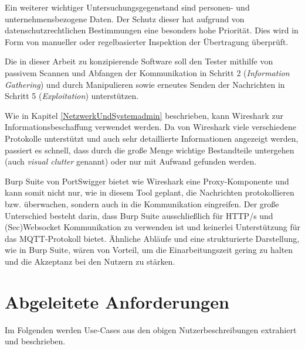     Ein weiterer wichtiger Untersuchungsgegenstand sind personen- und unternehmensbezogene Daten. Der Schutz dieser hat aufgrund von datenschutzrechtlichen Bestimmungen eine besonders hohe Priorität. Dies wird in Form von manueller oder regelbasierter Inspektion der Übertragung überprüft.
    
    
    Die in dieser Arbeit zu konzipierende Software soll den Tester mithilfe von passivem Scannen und Abfangen der Kommunikation in Schritt 2 (\emph{Information Gathering}) und durch Manipulieren sowie erneutes Senden der Nachrichten in Schritt 5 (\emph{Exploitation}) unterstützen.
    
    Wie in Kapitel \ref{NetzwerkUndSystemadmin} beschrieben, kann Wireshark zur Informationsbeschaffung verwendet werden.
    Da von Wireshark viele verschiedene Protokolle unterstützt und auch sehr detaillierte Informationen angezeigt werden, passiert es schnell, dass durch die große Menge wichtige Bestandteile untergehen (auch \emph{visual clutter} genannt) oder nur mit Aufwand gefunden werden.
    
    Burp Suite von PortSwigger bietet wie Wireshark eine Proxy-Komponente und kann somit nicht nur, wie in diesem Tool geplant, die Nachrichten protokollieren bzw. überwachen, sondern auch in die Kommunikation eingreifen. Der große Unterschied besteht darin, dass Burp Suite ausschließlich für HTTP/s und (Sec)Websocket Kommunikation zu verwenden ist und keinerlei Unterstützung für das \ac{MQTT}-Protokoll bietet. Ähnliche Abläufe und eine strukturierte Darstellung, wie in Burp Suite, wären von Vorteil, um die Einarbeitungszeit gering zu halten und die Akzeptanz bei den Nutzern zu stärken.

\section{Abgeleitete Anforderungen}
    Im Folgenden werden Use-Cases aus den obigen Nutzerbeschreibungen extrahiert und beschrieben.

